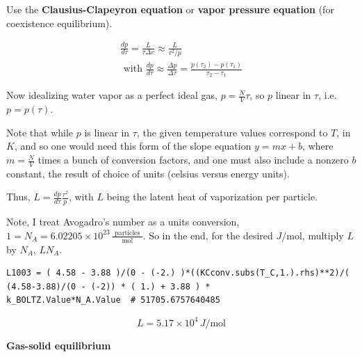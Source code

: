 Use the \textbf{Clausius-Clapeyron equation} or \textbf{vapor pressure equation} (for coexistence equilibrium).  

\[
\begin{gathered}
  \frac{dp}{d\tau} = \frac{L}{ \tau \Delta v} \approx \frac{L}{ \tau^2/p} \\ 
  \text{ with } \frac{dp}{d\tau} \approx \frac{\Delta p}{ \Delta \tau} = \frac{ p(\tau_2) - p(\tau_1) }{ \tau_2- \tau_1 }
\end{gathered}
\]

Now idealizing water vapor as a perfect ideal gas, $p = \frac{N}{V}\tau$, so $p$ linear in $\tau$, i.e. $p=p(\tau)$.  

Note that while $p$ is linear in $\tau$, the given temperature values correspond to $T$, in $K$, and so one would need this form of the slope equation $y=mx+b$, where $m=\frac{N}{V}$ times a bunch of conversion factors, and one must also include a nonzero $b$ constant, the result of choice of units (celsius versus energy units).  

Thus, $L = \frac{dp}{d\tau} \frac{\tau^2}{p}$, with $L$ being the latent heat of vaporization per particle.  

Note, I treat Avogadro's number as a units conversion, $1 = N_A = 6.02205 \times 10^{23} \, \frac{ \text{ particles }}{ \text{ mol } }$.  So in the end, for the desired $J/\text{mol}$, multiply $L$ by $N_A$, $LN_A$.  

\begin{lstlisting}
L1003 = ( 4.58 - 3.88 )/(0 - (-2.) )*((KCconv.subs(T_C,1.).rhs)**2)/( (4.58-3.88)/(0 - (-2)) * ( 1.) + 3.88 ) * 
k_BOLTZ.Value*N_A.Value  # 51705.6757640485 
\end{lstlisting}

\[
\boxed{L = 5.17 \times 10^4 \, J/\text{mol} }
\]

 \textbf{Gas-solid equilibrium}

